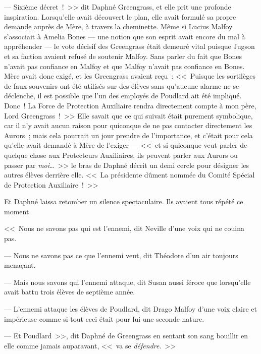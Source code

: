 --- Sixième décret~!~>> dit Daphné Greengrass, et elle prit une profonde inspiration. Lorsqu'elle avait découvert le plan, elle avait formulé sa propre demande auprès de Mère, à travers la cheminette. Même si Lucius Malfoy s'associait à Amelia Bones — une notion que son esprit avait encore du mal à appréhender — le vote décisif des Greengrass était demeuré vital puisque Jugson et sa faction avaient refusé de soutenir Malfoy. Sans parler du fait que Bones n'avait pas confiance en Malfoy et que Malfoy n'avait pas confiance en Bones. Mère avait donc exigé, et les Greengrass avaient reçu~: <<~Puisque les sortilèges de faux souvenirs ont été utilisés sur des élèves sans qu'aucune alarme ne se déclenche, il est possible que l'un des employés de Poudlard ait été impliqué. Donc~! La Force de Protection Auxiliaire rendra directement compte à mon père, Lord Greengrass~!~>> Elle savait que ce qui suivait était purement symbolique, car il n'y avait aucun raison pour quiconque de ne pas contacter directement les Aurors~; mais cela pourrait un jour prendre de l'importance, et c'était pour cela qu'elle avait demandé à Mère de l'exiger — <<~et si quiconque veut parler de quelque chose aux Protecteurs Auxiliaires, ils peuvent parler aux Aurors ou passer par \emph{moi}…~>> le bras de Daphné décrit un demi cercle pour désigner les autres élèves derrière elle. <<~La présidente dûment nommée du Comité Spécial de Protection Auxiliaire~!~>>

Et Daphné laissa retomber un silence spectaculaire. Ils avaient tous répété ce moment.

<<~Nous ne savons pas qui est l'ennemi, dit Neville d'une voix qui ne couina pas.

--- Nous ne savons pas ce que l'ennemi veut, dit Théodore d'un air toujours menaçant.

--- Mais nous savons qui l'ennemi attaque, dit Susan aussi féroce que lorsqu'elle avait battu trois élèves de septième année.

--- L'ennemi attaque les élèves de Poudlard, dit Drago Malfoy d'une voix claire et impérieuse comme si tout ceci était pour lui une seconde nature.

--- Et Poudlard~>>, dit Daphné de Greengrass en sentant son sang bouillir en elle comme jamais auparavant, <<~va se \emph{défendre}.~>>
